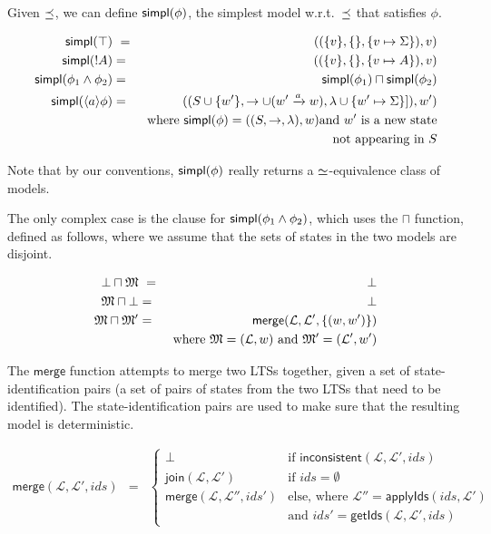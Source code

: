 Given $\preceq $, we can define $\mathsf{simpl}(\phi)$, the simplest model w.r.t.~$\preceq $ that
satisfies $\phi$.

\begin{eqnarray*}
  \mathsf{simpl}(\top) &\ = \ & ( (\{v\}, \{\}, \{v \mapsto \Sigma\}), v)  \\
  \mathsf{simpl}(! A) & = & ( (\{v\}, \{\}, \{v \mapsto A\}), v)  \\
  \mathsf{simpl}(\phi_1 \land \phi_2) & = & \mathsf{simpl}(\phi_1) \sqcap \mathsf{simpl}(\phi_2)  \\
  \mathsf{simpl}(\langle a \rangle \phi) 
     & = & ( (S \cup \{w'\}, \rightarrow \cup (w' \xrightarrow{a} w), \lambda \cup \{w' \mapsto \Sigma\}]), w')  \\
		& & \mbox{where }\mathsf{simpl}(\phi) = ( (S, \rightarrow, \lambda), w) \mbox{and } w' \mbox{ is a new state} \\
                &&  \mbox{not appearing in }S 
\end{eqnarray*}





\NI Note that by our conventions, $\mathsf{simpl}(\phi)$ really returns a
$\simeq$-equivalence class of models.

The only complex case is the clause for $\mathsf{simpl}(\phi_1 \land \phi_2)$,
which uses the $\sqcap$ function, defined as follows, where we assume
that the sets of states in the two models are disjoint.

\begin{eqnarray*}
  \bot \sqcap \frak{M}  &\ =\ &  \bot  \\
  \frak{M} \sqcap \bot      & = &  \bot  
     \\
  \frak{M} \sqcap \frak{M}'
     & = & 
     \mathsf{merge}(\mathcal{L}, \mathcal{L}', \{(w,w')\}) 
     \\
     & & \text{where } \frak{M} = (\mathcal{L}, w) \text{ and } \frak{M}' = (\mathcal{L'}, w')
\end{eqnarray*}

\NI The $\mathsf{merge}$ function attempts to merge two LTSs together, given a set of state-identification pairs (a set of pairs of states from the two LTSs that need to be identified).
The state-identification pairs are used to make sure that the resulting model is deterministic.

\begin{eqnarray*}
  \mathsf{merge}(\mathcal{L}, \mathcal{L}', ids) 
     & = & 
  \begin{cases}
    \bot & \text{if } \mathsf{inconsistent}(\mathcal{L}, \mathcal{L}', ids)  \\
    \mathsf{join}(\mathcal{L}, \mathcal{L}') & \text{if } ids = \emptyset  \\
    \mathsf{merge}(\mathcal{L}, \mathcal{L}'', ids')  & \text{else, where }
          \mathcal{L}'' = \mathsf{applyIds}(ids, \mathcal{L}') \\
          & \text{and } ids' = \mathsf{getIds}(\mathcal{L}, \mathcal{L}', ids)
  \end{cases}
\end{eqnarray*}

